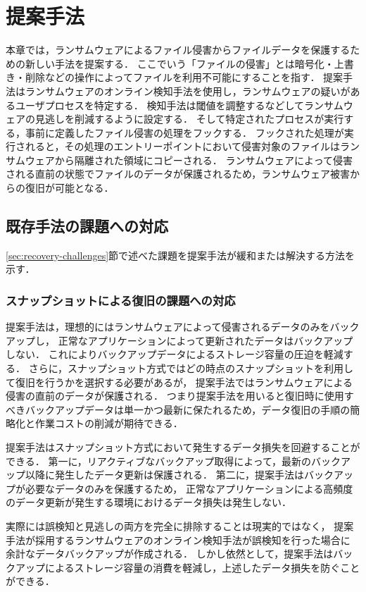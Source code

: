 \chapter{提案手法}
本章では，ランサムウェアによるファイル侵害からファイルデータを保護するための新しい手法を提案する．
ここでいう「ファイルの侵害」とは暗号化・上書き・削除などの操作によってファイルを利用不可能にすることを指す．
提案手法はランサムウェアのオンライン検知手法を使用し，ランサムウェアの疑いがあるユーザプロセスを特定する．
検知手法は閾値を調整するなどしてランサムウェアの見逃しを削減するように設定する．
そして特定されたプロセスが実行する，事前に定義したファイル侵害の処理をフックする．
フックされた処理が実行されると，その処理のエントリーポイントにおいて侵害対象のファイルはランサムウェアから隔離された領域にコピーされる．
ランサムウェアによって侵害される直前の状態でファイルのデータが保護されるため，ランサムウェア被害からの復旧が可能となる．

\section{既存手法の課題への対応}
\ref{sec:recovery-challenges}節で述べた課題を提案手法が緩和または解決する方法を示す．
\subsection{スナップショットによる復旧の課題への対応}
提案手法は，理想的にはランサムウェアによって侵害されるデータのみをバックアップし，
正常なアプリケーションによって更新されたデータはバックアップしない．
これによりバックアップデータによるストレージ容量の圧迫を軽減する．
さらに，スナップショット方式ではどの時点のスナップショットを利用して復旧を行うかを選択する必要があるが，
提案手法ではランサムウェアによる侵害の直前のデータが保護される．
つまり提案手法を用いると復旧時に使用すべきバックアップデータは単一かつ最新に保たれるため，データ復旧の手順の簡略化と作業コストの削減が期待できる．

提案手法はスナップショット方式において発生するデータ損失を回避することができる．
第一に，リアクティブなバックアップ取得によって，最新のバックアップ以降に発生したデータ更新は保護される．
第二に，提案手法はバックアップが必要なデータのみを保護するため，
正常なアプリケーションによる高頻度のデータ更新が発生する環境におけるデータ損失は発生しない．

実際には誤検知と見逃しの両方を完全に排除することは現実的ではなく，
提案手法が採用するランサムウェアのオンライン検知手法が誤検知を行った場合に
余計なデータバックアップが作成される．
しかし依然として，提案手法はバックアップによるストレージ容量の消費を軽減し，上述したデータ損失を防ぐことができる．

